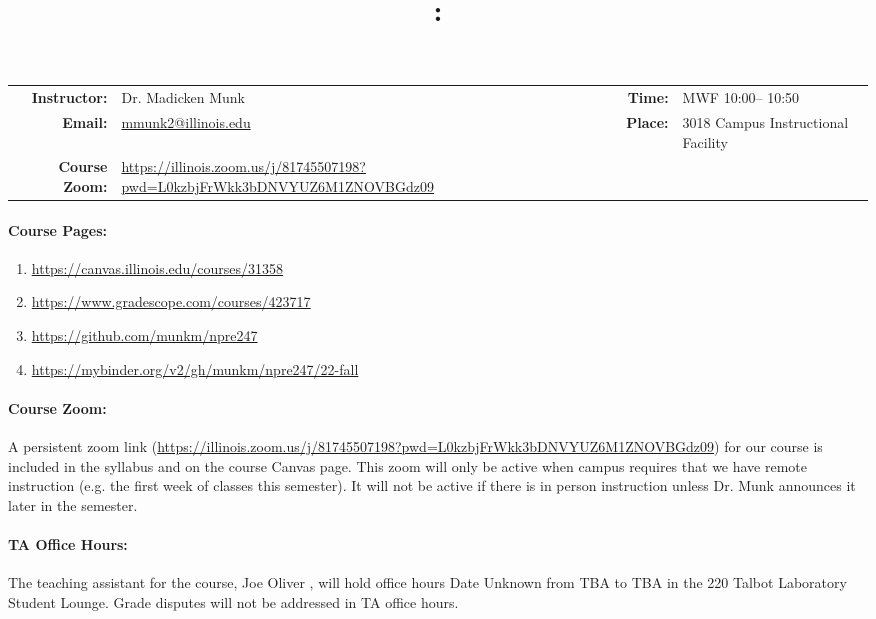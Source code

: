 \documentclass[11pt, a4paper]{article}
\title{\CourseNumber: \CourseTitle\\}
\author{\CourseUniversity}
\date{\CourseSemester \CourseYear}
\makeatletter
\newcommand{\CourseInstructor}{Dr. Madicken Munk\xspace}%
\newcommand{\CourseDays}{MWF\xspace}%
\newcommand{\CourseStart}{10:00\xspace}%
\newcommand{\CourseEnd}{10:50\xspace}%
\newcommand{\CourseInstructorEmail}{mmunk2@illinois.edu}
\newcommand{\CourseRoom}{3018\xspace}%
\newcommand{\CourseBuilding}{Campus Instructional Facility\xspace}%
\newcommand{\CourseZoom}{https://illinois.zoom.us/j/81745507198?pwd=L0kzbjFrWkk3bDNVYUZ6M1ZNOVBGdz09}%
\newcommand{\TeachingAssistant}{Joe Oliver \xspace}%
\newcommand{\TAOfficeHourDays}{Date Unknown \xspace}%
\newcommand{\TAOfficeHourStart}{TBA\xspace}%
\newcommand{\TAOfficeHourEnd}{TBA\xspace}%
\newcommand{\TAOfficeHourPlace}{the 220 Talbot Laboratory Student Lounge\xspace}
\makeatother
\begin{document}
\maketitle
\renewcommand{\arraystretch}{1.5}
\begin{center}
\begin{table}[h]
\begin{tabularx}{\textwidth}{rXrX}
\hline
\textbf{Instructor:} & \CourseInstructor & \textbf{Time:} & \CourseDays \CourseStart -- \CourseEnd \\
\textbf{Email:} &  \href{mailto:\CourseInstructorEmail}{\CourseInstructorEmail} & \textbf{Place:} & \CourseRoom \CourseBuilding\\
\textbf{Course Zoom:} & \url{\CourseZoom} & & \\
\hline
\end{tabularx}
\end{table}
\end{center}

\paragraph{Course Pages:}
\begin{enumerate}
        \item \url{https://canvas.illinois.edu/courses/31358}
        \item \url{https://www.gradescope.com/courses/423717}
        \item \url{https://github.com/munkm/npre247}
        \item \url{https://mybinder.org/v2/gh/munkm/npre247/22-fall}
\end{enumerate}

\paragraph{Course Zoom:} A persistent zoom link (\url{\CourseZoom})
for our course is included in
the syllabus and on the course Canvas page.
This zoom will only be active when campus
requires that we have remote instruction (e.g. the first week of classes this
semester). It will not be active if there is in person instruction unless Dr.
Munk announces it later in the semester.

\paragraph{TA Office Hours:} The teaching assistant for the course,
\TeachingAssistant, will hold office hours \TAOfficeHourDays from
\TAOfficeHourStart to \TAOfficeHourEnd in \TAOfficeHourPlace.
Grade disputes will not be addressed in TA office hours.
\end{document}

